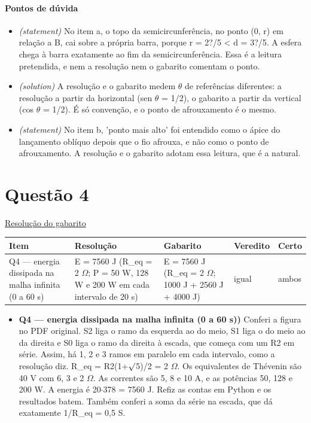 \documentclass{article}%
\begin{document}
\paragraph{Pontos de dúvida}%
\begin{itemize}%
\item%
\textit{(statement)} No item a, o topo da semicircunferência, no ponto (0, r) em relação a B, cai sobre a própria barra, porque r = 2?/5 < d = 3?/5. A esfera chega à barra exatamente ao fim da semicircunferência. Essa é a leitura pretendida, e nem a resolução nem o gabarito comentam o ponto.%
\item%
\textit{(solution)} A resolução e o gabarito medem $\theta$ de referências diferentes: a resolução a partir da horizontal (sen $\theta$ = 1/2), o gabarito a partir da vertical (cos $\theta$ = 1/2). É só convenção, e o ponto de afrouxamento é o mesmo.%
\item%
\textit{(statement)} No item b, 'ponto mais alto' foi entendido como o ápice do lançamento oblíquo depois que o fio afrouxa, e não como o ponto de afrouxamento. A resolução e o gabarito adotam essa leitura, que é a natural.%
\end{itemize}%
\section*{Questão 4}%
\href{https://poliedroresolve.sistemapoliedro.com.br/vestibulares/ime/2026/ime-2-fase-dia-2-24-10-2025-2-fase-dia-2/dissertativa-4-fisica-2-fase-dia-2-ime-2026}{Resolução do gabarito}\par\smallskip%
\begin{longtable}{@{}p{} p{} p{} p{} p{}@{}}\toprule Item & Resolução & Gabarito & Veredito & Certo \\ \midrule
Q4 --- energia dissipada na malha infinita (0 a 60 s) & E = 7560 J (R\_eq = 2 $\Omega$; P = 50 W, 128 W e 200 W em cada intervalo de 20 s) & E = 7560 J (R\_eq = 2 $\Omega$; 1000 J + 2560 J + 4000 J) & igual & ambos \\
\bottomrule\end{longtable}%
\begin{itemize}%
\item%
\textbf{Q4 --- energia dissipada na malha infinita (0 a 60 s))} Conferi a figura no PDF original. S2 liga o ramo da esquerda ao do meio, S1 liga o do meio ao da direita e S0 liga o ramo da direita à escada, que começa com um R2 em série. Assim, há 1, 2 e 3 ramos em paralelo em cada intervalo, como a resolução diz. R\_eq = R2(1+$\surd$5)/2 = 2 $\Omega$. Os equivalentes de Thévenin são 40 V com 6, 3 e 2 $\Omega$. As correntes são 5, 8 e 10 A, e as potências 50, 128 e 200 W. A energia é 20$\cdot$378 = 7560 J. Refiz as contas em Python e os resultados batem. Também conferi a soma da série na escada, que dá exatamente 1/R\_eq = 0,5 S.%
\end{itemize}%
\end{document}
